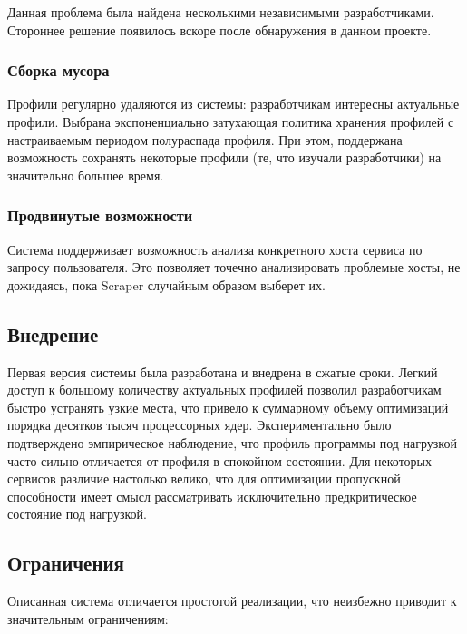 Данная проблема была найдена несколькими независимыми разработчиками.
Стороннее решение появилось \cite{flamegraph:weight} вскоре после обнаружения в данном проекте.

\subsubsection{Сборка мусора}
Профили регулярно удаляются из системы: разработчикам интересны актуальные профили.
Выбрана экспоненциально затухающая политика хранения профилей с настраиваемым периодом полураспада профиля.
При этом, поддержана возможность сохранять некоторые профили (те, что изучали разработчики) на значительно большее время.

\subsubsection{Продвинутые возможности}
Система поддерживает возможность анализа конкретного хоста сервиса по запросу пользователя.
Это позволяет точечно анализировать проблемые хосты, не дожидаясь, пока Scraper случайным образом выберет их.

\subsection{Внедрение}
Первая версия системы была разработана и внедрена в сжатые сроки.
Легкий доступ к большому количеству актуальных профилей позволил разработчикам быстро устранять узкие места,
что привело к суммарному объему оптимизаций порядка десятков тысяч процессорных ядер.
Экспериментально было подтверждено эмпирическое наблюдение, что профиль программы под нагрузкой часто сильно отличается от профиля в
спокойном состоянии. Для некоторых сервисов различие настолько велико, что для оптимизации пропускной способности имеет
смысл рассматривать исключительно предкритическое состояние под нагрузкой.

\subsection{Ограничения}
Описанная система отличается простотой реализации, что неизбежно приводит к значительным ограничениям:

